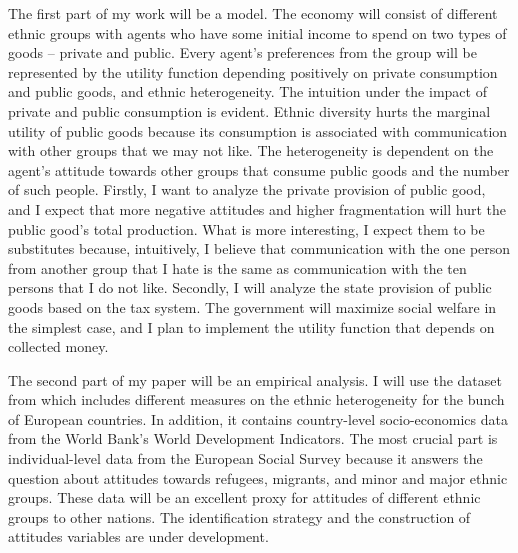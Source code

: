 \documentclass[letterpaper,11pt]{article}
\begin{document}
The first part of my work will be a model. The economy will consist of different ethnic groups with agents who have some initial income to spend on two types of goods -- private and public. Every agent's preferences from the group will be represented by the utility function depending positively on private consumption and public goods, and ethnic heterogeneity. The intuition under the impact of private and public consumption is evident. Ethnic diversity hurts the marginal utility of public goods because its consumption is associated with communication with other groups that we may not like. The heterogeneity is dependent on the agent's attitude towards other groups that consume public goods and the number of such people. Firstly, I want to analyze the private provision of public good, and I expect that more negative attitudes and higher fragmentation will hurt the public good's total production.
What is more interesting, I expect them to be substitutes because, intuitively, I believe that communication with the one person from another group that I hate is the same as communication with the ten persons that I do not like. Secondly, I will analyze the state provision of public goods based on the tax system. The government will maximize social welfare in the simplest case, and I plan to implement the utility function that depends on collected money.

The second part of my paper will be an empirical analysis. I will use the dataset from \cite{Refuges} which includes different measures on the ethnic heterogeneity for the bunch of European countries. In addition, it contains country-level socio-economics data from the World Bank's World Development Indicators. The most crucial part is individual-level data from the European Social Survey because it answers the question about attitudes towards refugees, migrants, and minor and major ethnic groups. These data will be an excellent proxy for attitudes of different ethnic groups to other nations. The identification strategy and the construction of attitudes variables are under development.  



\end{document}
